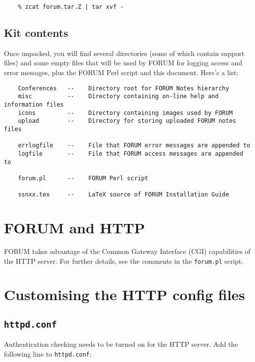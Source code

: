 \begin{verbatim}
    % zcat forum.tar.Z | tar xvf -
\end{verbatim}

\subsection{Kit contents}

Once unpacked, you will find several directories (some of which
contain support files) and some empty files that will be used by FORUM 
for logging access and error messages, plus the FORUM Perl script and this
document. Here's a list:

\begin{verbatim}
    Conferences   --    Directory root for FORUM Notes hierarchy
    misc          --    Directory containing on-line help and information files
    icons         --    Directory containing images used by FORUM
    upload        --    Directory for storing uploaded FORUM notes files

    errlogfile    --    File that FORUM error messages are appended to
    logfile       --    File that FORUM access messages are appended to

    forum.pl      --    FORUM Perl script

    ssnxx.tex     --    LaTeX source of FORUM Installation Guide
\end{verbatim}



\section{FORUM and HTTP}

FORUM takes advantage of the Common Gateway Interface (CGI) capabilities of the 
HTTP server. For further details, see the comments in the {\tt forum.pl}
script.

\section{Customising the HTTP config files}

\subsection{{\tt httpd.conf}}

Authentication checking needs to be turned on for the HTTP server. Add the
following line to {\tt httpd.conf}:

